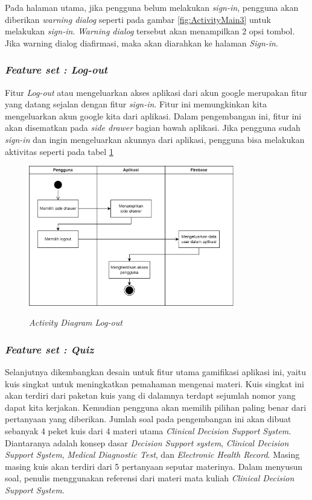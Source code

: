 Pada halaman utama, jika pengguna belum melakukan \textit{sign-in}, pengguna akan diberikan \textit{warning dialog} seperti pada gambar \ref*{fig:ActivityMain3} untuk melakukan \textit{sign-in}.
\textit{Warning dialog} tersebut akan menampilkan 2 opsi tombol. Jika warning dialog diafirmasi, maka akan diarahkan ke halaman \textit{Sign-in}.
\subsubsection{\textit{Feature set : Log-out}}
Fitur \textit{Log-out} atau mengeluarkan akses aplikasi dari akun google merupakan fitur yang datang sejalan dengan fitur \textit{sign-in}.
Fitur ini memungkinkan kita mengeluarkan akun google kita dari aplikasi. Dalam pengembangan ini, fitur ini akan disematkan pada \textit{side drawer} bagian bawah aplikasi.
Jika pengguna sudah \textit{sign-in} dan ingin mengeluarkan akunnya dari aplikasi, pengguna bisa melakukan aktivitas seperti pada tabel \ref*{Fig:ActivityOut}
\begin{figure}[H]
	\centering
	\caption{\textit{Activity Diagram Log-out}}
	\includegraphics[width=0.8\textwidth]{contents/chapter-3/images/AD-signout.png}
	\label{Fig:ActivityOut}
\end{figure}
\subsubsection{\textit{Feature set : Quiz}}
Selanjutnya dikembangkan desain untuk fitur utama gamifikasi aplikasi ini, yaitu kuis singkat untuk meningkatkan pemahaman mengenai materi.
Kuis singkat ini akan terdiri dari paketan kuis yang di dalamnya terdapt sejumlah nomor yang dapat kita kerjakan. Kemudian pengguna akan memilih pilihan paling benar dari pertanyaan yang diberikan.
Jumlah soal pada pengembangan ini akan dibuat sebanyak 4 peket kuis dari 4 materi utama \textit{Clinical Decision Support System}. Diantaranya adalah konsep dasar \textit{Decision Support system}, \textit{Clinical Decision Support System}, \textit{Medical Diagnostic Test}, dan \textit{Electronic Health Record}.
Masing masing kuis akan terdiri dari 5 pertanyaan seputar materinya. Dalam menyusun soal, penulis menggunakan referensi dari materi mata kuliah \textit{Clinical Decision Support System}.

